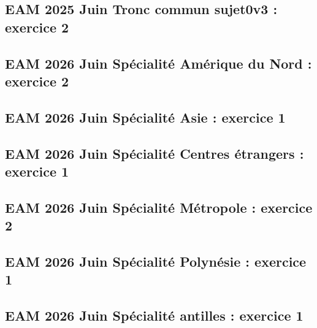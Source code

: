 \documentclass[lang=fr,edition=teacher,layout=sheet]{mxbook}
\begin{document}
\par\bigskip
{}\subsection*{EAM 2025 Juin Tronc commun sujet0v3 : exercice 2}
\begingroup\endgroup
\par\bigskip
{}\subsection*{EAM 2026 Juin Spécialité Amérique du Nord : exercice 2}
\begingroup\endgroup
\par\bigskip
{}\subsection*{EAM 2026 Juin Spécialité Asie : exercice 1}
\begingroup\endgroup
\par\bigskip
{}\subsection*{EAM 2026 Juin Spécialité Centres étrangers : exercice 1}
\begingroup\endgroup
\par\bigskip
{}\subsection*{EAM 2026 Juin Spécialité Métropole : exercice 2}
\begingroup\endgroup
\par\bigskip
{}\subsection*{EAM 2026 Juin Spécialité Polynésie : exercice 1}
\begingroup\endgroup
\par\bigskip
{}\subsection*{EAM 2026 Juin Spécialité antilles : exercice 1}
\end{document}
